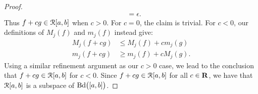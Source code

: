 \documentclass[11pt,twoside,openany]{memoir}
\begin{document}
\begin{proof}
\begin{equation*}
\begin{split}
                    & = \epsilon.
                \end{split}
                \end{equation*}
            Thus $f+cg \in \mathcal{R}[a,b]$ when $c > 0$. For $c = 0$, the claim is trivial. For $c < 0$, our definitions of $M_j(f)$ and $m_j(f)$ instead give:
                \begin{equation*}
                \begin{split}
                    M_j(f + cg) &\leq M_j(f) + cm_j(g) \\
                    m_j(f + cg) &\geq m_j(f) + cM_j(g).
                \end{split}
                \end{equation*}
            Using a similar refinement argument as our $c > 0$ case, we lead to the conclusion that $f+cg \in \mathcal{R}[a,b]$ for $c < 0$. Since $f+cg \in \mathcal{R}[a,b]$ for all $c \in \mathbf{R}$, we have that $\mathcal{R}[a,b]$ is a subspace of $\operatorname{Bd}\bigl([a,b]\bigr)$.
        \end{proof}
\end{document}
